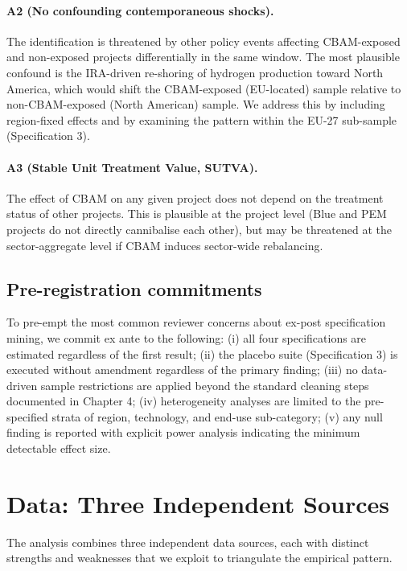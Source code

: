 \documentclass[11pt,a4paper]{article}
\begin{document}
\paragraph{A2 (No confounding contemporaneous shocks).} The identification is threatened by other policy events affecting CBAM-exposed and non-exposed projects differentially in the same window. The most plausible confound is the IRA-driven re-shoring of hydrogen production toward North America, which would shift the CBAM-exposed (EU-located) sample relative to non-CBAM-exposed (North American) sample. We address this by including region-fixed effects and by examining the pattern within the EU-27 sub-sample (Specification 3).

\paragraph{A3 (Stable Unit Treatment Value, SUTVA).} The effect of CBAM on any given project does not depend on the treatment status of other projects. This is plausible at the project level (Blue and PEM projects do not directly cannibalise each other), but may be threatened at the sector-aggregate level if CBAM induces sector-wide rebalancing.

\subsection{Pre-registration commitments}

To pre-empt the most common reviewer concerns about ex-post specification mining, we commit ex ante to the following: (i) all four specifications are estimated regardless of the first result; (ii) the placebo suite (Specification 3) is executed without amendment regardless of the primary finding; (iii) no data-driven sample restrictions are applied beyond the standard cleaning steps documented in Chapter 4; (iv) heterogeneity analyses are limited to the pre-specified strata of region, technology, and end-use sub-category; (v) any null finding is reported with explicit power analysis indicating the minimum detectable effect size.

\section{Data: Three Independent Sources}
\label{sec:ch8-data}

The analysis combines three independent data sources, each with distinct strengths and weaknesses that we exploit to triangulate the empirical pattern.
\end{document}
